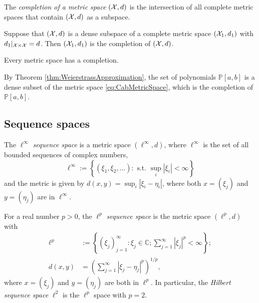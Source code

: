\begin{defn}
  \label{def:completionMetricSpace}
  The \emph{completion of a metric space} $({\cal X}, d)$ 
  is the intersection of all complete metric spaces
  that contain $({\cal X}, d)$ as a subspace.
\end{defn}


\begin{lem}
  \label{lem:denseCompletion}
  Suppose that $({\cal X}, d)$ is a dense subspace
  of a complete metric space $({\cal X}_1, d_1)$
  with $d_1|_{{\cal X}\times{\cal X}} = d$.
  Then $({\cal X}_1, d_1)$ is the completion of $({\cal X}, d)$.
\end{lem}


\begin{thm}
  \label{thm:existenceOfMetricCompletion}
  Every metric space has a completion.
\end{thm}

\begin{exm}
  \label{exm:polynomialDenseInCab}
  By Theorem \ref{thm:WeierstrassApproximation}, 
  the set of polynomials $\mathbb{P}[a,b]$
  is a dense subset of the metric space \eqref{eq:CabMetricSpace}, 
  which is the completion of $\mathbb{P}[a,b]$.
\end{exm}


\subsection{Sequence spaces}
\label{sec:metric-spaces-basicAnal}


\begin{defn}
  \label{def:lInftySeqSpace}
  The $\ell^{\infty}$ \emph{sequence space} 
  is a metric space $(\ell^{\infty},d)$,
  where $\ell^{\infty}$ is the set of all bounded sequences
  of complex numbers,
  \begin{equation}
    \label{eq:ellInftySpace}
    \ell^{\infty} := \left\{
      (\xi_1, \xi_2, \ldots):
      \text{ s.t. } \sup_{i}|\xi_i| < \infty
      \right\}
  \end{equation}
  and the metric is given by
  $d(x,y) = \sup_{i}|\xi_i- \eta_i|$, 
  where both $x=(\xi_j)$ and $y=(\eta_j)$ are in $\ell^{\infty}$. 
\end{defn}

\begin{defn}
  \label{def:lpSpace}
  For a real number $p>0$,
   the \emph{$\ell^p$ sequence space} is the metric space $(\ell^p, d)$
   with
  \begin{align}
    \label{eq:lpSpace}
    \ell^p &:= \left\{
               (\xi_j)_{j=1}^{\infty}: \xi_j\in \mathbb{C};
               \sum_{j=1}^{\infty} |\xi_j|^p < \infty
    \right\};
    \\
    \label{eq:lpMetric}
    d(x,y) &= \left(\sum_{j=1}^{\infty} |\xi_j -\eta_j|^p\right)^{1/p},
  \end{align}             
  where $x=(\xi_j)$ and $y=(\eta_j)$ are both in $\ell^p$.
  In particular, the \emph{Hilbert sequence space} $\ell^2$
   is the $\ell^p$ space with $p=2$.
\end{defn}



